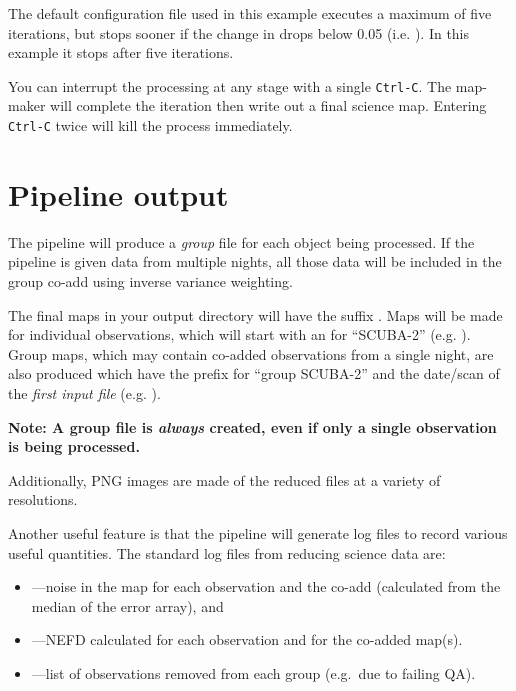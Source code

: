 The default configuration file used in this example executes a maximum
of five iterations, but stops sooner if the change in 
drops below 0.05 (i.e. ). In this example it
stops after five iterations.



\begin{tip}
  You can interrupt the processing at any stage with a single
  \texttt{Ctrl-C}. The map-maker will complete the iteration then
  write out a final science map. Entering \texttt{Ctrl-C} twice will
  kill the process immediately.
\end{tip}

\section{Pipeline output}

The pipeline will produce a \textit{group} file for each object being
processed. If the pipeline is given data from multiple nights, all
those data will be included in the group co-add using inverse variance
weighting.

The final maps in your output directory will have the suffix
. Maps will be made for individual observations, which
will start with an  for ``SCUBA-2'' (e.g.
). Group maps, which may
contain co-added observations from a single night, are also produced
which have the prefix  for ``group SCUBA-2'' and the date/scan
of the \textit{first input file}
(e.g. ).

\textbf{Note: A group file is \emph{always} created, even if only a
single observation is being processed.}

Additionally, PNG images are made of the reduced files at a variety of
resolutions.

Another useful feature is that the pipeline will generate log files
to record various useful quantities. The standard log files from
reducing science data are:

\begin{itemize}
\item {}---noise in the map for each observation and the co-add
(calculated from the median of the error array), and
\item {}---NEFD calculated for each observation and for
the co-added map(s).
\item {}---list of observations removed from each
  group (e.g.~due to failing QA).
\end{itemize}

